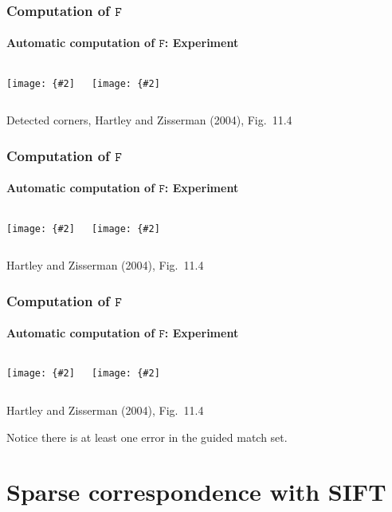\documentclass[aspectratio=169]{beamer}
\newcommand{\mat}[1]{\mathtt{#1}}
\newcommand{\myfig}[3]{\centerline{\texttt{[image: \{\#2]}}}
    \centerline{\scriptsize #3}}
\begin{document}
\begin{frame}
\frametitle{Computation of $\mat{F}$}
\framesubtitle{Automatic computation of $\mat{F}$: Experiment}

\begin{columns}
\column{2.25in}
\myfig{2.2in}{HZ-fig10-4c}{}
\column{2.25in}
\myfig{2.2in}{HZ-fig10-4d}{}
\end{columns}

\centerline{\scriptsize Detected corners, Hartley and Zisserman
(2004), Fig.\ 11.4}

\end{frame}

\begin{frame}
\frametitle{Computation of $\mat{F}$}
\framesubtitle{Automatic computation of $\mat{F}$: Experiment}

\begin{columns}
\column{2.25in}
\myfig{2.2in}{HZ-fig10-4e}{188 putative matches}
\column{2.25in}
\myfig{2.2in}{HZ-fig10-4f}{Outliers according to RANSAC (89/188)}
\end{columns}

\medskip

\centerline{\scriptsize Hartley and Zisserman (2004), Fig.\ 11.4}

\end{frame}

\begin{frame}
\frametitle{Computation of $\mat{F}$}
\framesubtitle{Automatic computation of $\mat{F}$: Experiment}

\begin{columns}
\column{2.25in}
\myfig{2.2in}{HZ-fig10-4g}{Inliers according to RANSAC (99/188)}
\column{2.25in}
\myfig{2.2in}{HZ-fig10-4h}{Final set of 157 matches from guided matching}
\end{columns}

\bigskip

\centerline{\scriptsize Hartley and Zisserman (2004), Fig.\ 11.4}

Notice there is at least one error in the guided match set.

\end{frame}

\section{Sparse correspondence with SIFT}
\end{document}
